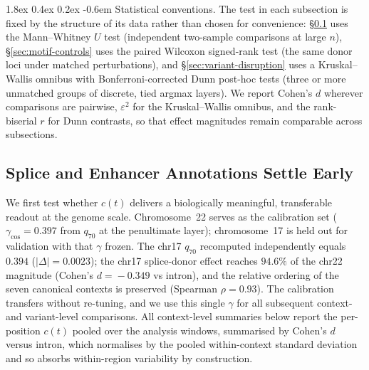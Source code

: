 \documentclass{article}
\makeatletter
\renewcommand\paragraph{\@startsection{paragraph}{4}{\z@}%
  {1.8ex \@plus 0.4ex \@minus 0.2ex}%
  {-0.6em}%
{\normalfont\normalsize\bfseries}}
\theoremstyle{plain}
\theoremstyle{definition}
\theoremstyle{remark}
\makeatother
\begin{document}
\paragraph{Statistical conventions.} The test in each subsection is fixed by the structure of its data rather than chosen for convenience: \S\ref{sec:shallowness} uses the Mann--Whitney $U$ test (independent two-sample comparisons at large $n$), \S\ref{sec:motif-controls} uses the paired Wilcoxon signed-rank test (the same donor loci under matched perturbations), and \S\ref{sec:variant-disruption} uses a Kruskal--Wallis omnibus with Bonferroni-corrected Dunn post-hoc tests (three or more unmatched groups of discrete, tied argmax layers). We report Cohen's $d$ wherever comparisons are pairwise, $\varepsilon^2$ for the Kruskal--Wallis omnibus, and the rank-biserial $r$ for Dunn contrasts, so that effect magnitudes remain comparable across subsections.

\subsection{Splice and Enhancer Annotations Settle Early}
\label{sec:shallowness}

We first test whether $c(t)$ delivers a biologically meaningful, transferable readout at the genome scale. Chromosome~22 serves as the calibration set ($\gamma_{\cos}\!=\!0.397$ from $q_{70}$ at the penultimate layer); chromosome~17 is held out for validation with that $\gamma$ frozen. The chr17 $q_{70}$ recomputed independently equals $0.394$ ($|\Delta|\!=\!0.0023$); the chr17 splice-donor effect reaches $94.6\%$ of the chr22 magnitude (Cohen's $d\!=\!-0.349$ vs intron), and the relative ordering of the seven canonical contexts is preserved (Spearman $\rho\!=\!0.93$). The calibration transfers without re-tuning, and we use this single $\gamma$ for all subsequent context- and variant-level comparisons. All context-level summaries below report the per-position $c(t)$ pooled over the analysis windows, summarised by Cohen's $d$ versus intron, which normalises by the pooled within-context standard deviation and so absorbs within-region variability by construction.
\end{document}
